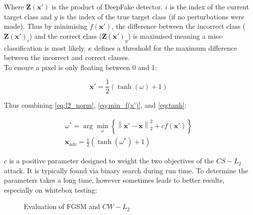 \documentclass{article}
\begin{document}
Where $\mathbf{Z}(\mathbf{x}')$ is the product of DeepFake detector. $i$ is the index of the current target class and $y$ is the index of the true target class (if no perturbations were made). Thus by minimising $f(\mathbf{x}')$, the difference between the incorrect class ($\mathbf{Z}{{\left( {{\mathbf{x}}'} \right)}_i}$) and the correct class (${\mathbf{Z}}{{\left( {{\mathbf{x}}'} \right)}_y}$) is maximised meaning a miss-classification is most likely. $\kappa$ defines a threshold for the maximum difference between the incorrect and correct classes.\\

To ensure a pixel is only floating between 0 and 1:

\begin{equation}
\label{eq:tanh}
    \mathbf{x}' = \frac{1}{2}(\tanh (\omega ) + 1)
\end{equation}

Thus combining \ref{eq:l2_norm}, \ref{eq:min_f(x')}, and \ref{eq:tanh}:

\begin{equation}
\begin{array}{c}
    \omega^\ast = \arg \min_\omega \left\{ \left\| \mathbf{x}' - \mathbf{x} \right\|_2^2 + cf\left( \mathbf{x}' \right) \right\} \\
    \mathbf{x}_{adv} = \frac{1}{2}\left( \tanh \left( \omega^\ast \right) + 1 \right)
\end{array}
\end{equation}

$c$ is a positive parameter designed to weight the two objectives of the $CS-L_2$ attack. It is typically found via binary search during run time. To determine the parameters takes a long time, however sometimes leads to better results, especially on whitebox testing:

\begin{figure}[H]
    \centering
    \caption{Evaluation of FGSM and $CW-L_2$}
    \label{fig:fgsm}
\end{figure}
\end{document}
